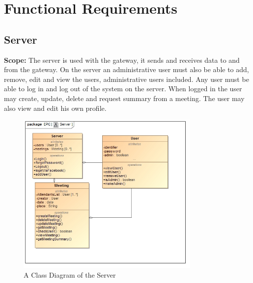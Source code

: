 \documentclass[a4paper,12pt,titlepage]{article}
\begin{document}
\newpage
	\section{Functional Requirements}
	
		\subsection{Server}
		\textbf{Scope: } 	The server is used with the gateway, it sends and receives data to and from the gateway. On the server an administrative user must also be able to add, remove, edit and view the users, administrative users included. Any user must be able to log in and log out of the system on the server. When logged in the user may create, update, delete and request summary from a meeting. The user may also view and edit his own profile.
		\begin{figure}[h!]
 			 \centering
			  \includegraphics[width=0.8\textwidth]{ServerClass}
		 	 \caption{A Class Diagram of the Server}
		\end{figure}
\end{document}
